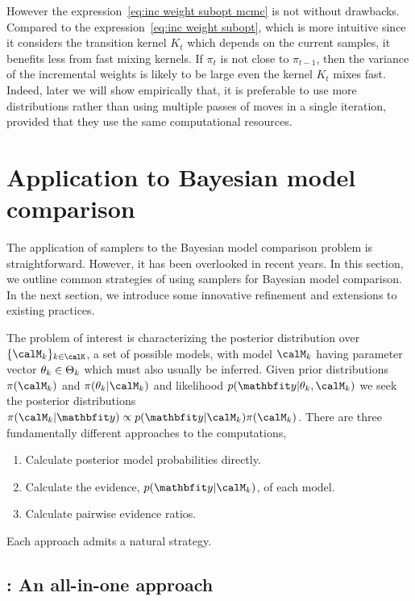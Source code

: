 However the expression~\eqref{eq:inc weight subopt mcmc} is not without
drawbacks. Compared to the expression~\eqref{eq:inc weight subopt}, which is
more intuitive since it considers the transition kernel $K_t$ which depends on
the current samples, it benefits less from fast mixing kernels. If $\pi_t$ is
not close to $\pi_{t-1}$, then the variance of the incremental weights is
likely to be large even the kernel $K_t$ mixes fast. Indeed, later we will
show empirically that, it is preferable to use more distributions rather than
using multiple passes of \mcmc moves in a single iteration, provided that they
use the same computational resources.

\section{Application to Bayesian model comparison}
\label{sec:Application to Bayesian model comparison}

The application of \smc samplers to the Bayesian model comparison problem is
straightforward. However, it has been overlooked in recent years. In this
section, we outline common strategies of using \smc samplers for Bayesian
model comparison. In the next section, we introduce some innovative refinement
and extensions to existing practices.

The problem of interest is characterizing the posterior distribution over
$\{\Mk\}_{k\in\calK}$, a set of possible models, with model $\Mk$ having
parameter vector $\theta_{k}\in\Theta_{k}$ which must also usually be inferred.
Given prior distributions $\pi(\Mk)$ and $\pi(\paramk|\Mk)$ and likelihood
$p(\data|\paramk,\Mk)$ we seek the posterior distributions $\pi(\Mk|\data)
\propto p(\data|\Mk)\pi(\Mk)$. There are three fundamentally different
approaches to the computations,
\begin{enumerate}
  \item Calculate posterior model probabilities directly.
  \item Calculate the evidence, $p(\data|\Mk)$, of each model.
  \item Calculate pairwise evidence ratios.
\end{enumerate}
Each approach admits a natural \smc strategy.

\subsection{\smc[1]: An all-in-one approach}
\label{sub:smc1: An all-in-one approach}

